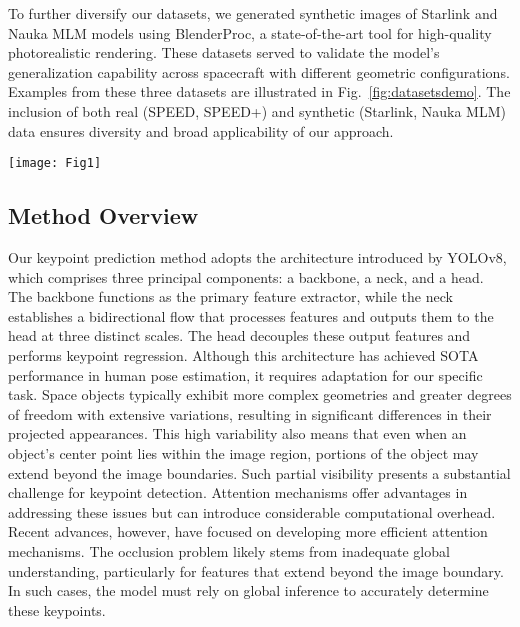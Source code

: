 \documentclass[a4paper,fleqn]{cas-sc}
\begin{document}
To further diversify our datasets, we generated synthetic images of Starlink and Nauka MLM models using BlenderProc, a state-of-the-art tool for high-quality photorealistic rendering. These datasets served to validate the model's generalization capability across spacecraft with different geometric configurations. Examples from these three datasets are illustrated in Fig.~\ref{fig:datasetsdemo}. The inclusion of both real (SPEED, SPEED+) and synthetic (Starlink, Nauka MLM) data ensures diversity and broad applicability of our approach.

\begin{figure*}[!htbp]
	\centering
	\texttt{[image: Fig1]} 
	\caption{Representative examples from the three datasets employed in this study: SPEED+, an open dataset provided by ESA, and Nauka MLM and Starlink, our synthetic datasets generated for comprehensive evaluation.}
	\label{fig:datasetsdemo}
\end{figure*}

\subsection{Method Overview}\label{sec:Method_Overview}
Our keypoint prediction method adopts the architecture introduced by YOLOv8, which comprises three principal components: a backbone, a neck, and a head. The backbone functions as the primary feature extractor, while the neck establishes a bidirectional flow that processes features and outputs them to the head at three distinct scales. The head decouples these output features and performs keypoint regression. Although this architecture has achieved SOTA performance in human pose estimation, it requires adaptation for our specific task. Space objects typically exhibit more complex geometries and greater degrees of freedom with extensive variations, resulting in significant differences in their projected appearances. This high variability also means that even when an object's center point lies within the image region, portions of the object may extend beyond the image boundaries. Such partial visibility presents a substantial challenge for keypoint detection. Attention mechanisms offer advantages in addressing these issues but can introduce considerable computational overhead. Recent advances, however, have focused on developing more efficient attention mechanisms. The occlusion problem likely stems from inadequate global understanding, particularly for features that extend beyond the image boundary. In such cases, the model must rely on global inference to accurately determine these keypoints.
\end{document}
